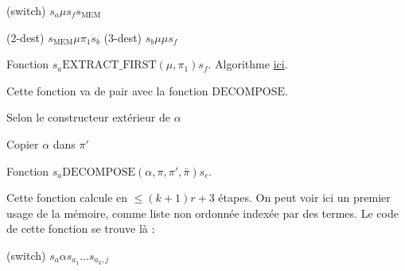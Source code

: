 \documentclass{report}
\begin{document}
\begin{appendices}
\begin{algorithm}[H]
					(switch)	$s_a \mu s_f s_{\text{MEM}}$\;
					
					(2-dest) 	$s_{\text{MEM}} \mu \pi_1 s_b$\;
					(3-dest) 	$s_b \mu \mu s_f$\;
					
					
					\caption{Fonction $s_a \text{EXTRACT\_FIRST}(\mu, \pi_1) s_f$. Algorithme \hyperref[algo:A_RAM_fn_extract_first]{ici}. }
				\end{algorithm}
				
				\espace 
				
				Cette fonction va de pair avec la fonction $\text{DECOMPOSE}$.

				\espace 
				
				\begin{algorithm}[H]
					\label{algo:A_RAM_fn_DECOMPOSE}
					
					
					Selon le constructeur extérieur de $\alpha$ \;
					
					
					Copier $\alpha$ dans $\pi'$ \;
					
					\caption{Fonction $s_a \text{DECOMPOSE}(\alpha, \pi, \pi', \bar{\pi}) s_c$.}
				\end{algorithm}
				
				\espace
				
				Cette fonction calcule en $\leq (k+1)r+3$ étapes. On peut voir ici un premier usage de la mémoire, comme liste non ordonnée indexée par des termes. Le code de cette fonction se trouve là :
				
				\espace
				
				\begin{algorithm}[H]
					\label{prog:A_RAM_fn_DECOMPOSE}
					
					
					(switch) 	$s_a \alpha s_{a_1} \dots s_{a_k,j}$\;
					

\end{algorithm}
\end{appendices}
\end{document}
